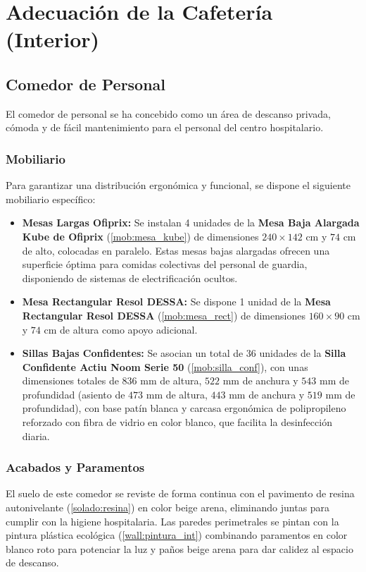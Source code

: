 \section{Adecuación de la Cafetería (Interior)}

\subsection{Comedor de Personal}
El comedor de personal se ha concebido como un área de descanso privada, cómoda y de fácil mantenimiento para el personal del centro hospitalario. 

\subsubsection{Mobiliario}
Para garantizar una distribución ergonómica y funcional, se dispone el siguiente mobiliario específico:
\begin{itemize}
    \item \textbf{Mesas Largas Ofiprix:} Se instalan 4 unidades de la \textbf{Mesa Baja Alargada Kube de Ofiprix} (\ref{mob:mesa_kube}) de dimensiones $240\times142\text{ cm}$ y $74\text{ cm}$ de alto, colocadas en paralelo. Estas mesas bajas alargadas ofrecen una superficie óptima para comidas colectivas del personal de guardia, disponiendo de sistemas de electrificación ocultos.
    \item \textbf{Mesa Rectangular Resol DESSA:} Se dispone 1 unidad de la \textbf{Mesa Rectangular Resol DESSA} (\ref{mob:mesa_rect}) de dimensiones $160\times90\text{ cm}$ y $74\text{ cm}$ de altura como apoyo adicional.
    \item \textbf{Sillas Bajas Confidentes:} Se asocian un total de 36 unidades de la \textbf{Silla Confidente Actiu Noom Serie 50} (\ref{mob:silla_conf}), con unas dimensiones totales de $836\text{ mm}$ de altura, $522\text{ mm}$ de anchura y $543\text{ mm}$ de profundidad (asiento de $473\text{ mm}$ de altura, $443\text{ mm}$ de anchura y $519\text{ mm}$ de profundidad), con base patín blanca y carcasa ergonómica de polipropileno reforzado con fibra de vidrio en color blanco, que facilita la desinfección diaria.
\end{itemize}

\subsubsection{Acabados y Paramentos}
El suelo de este comedor se reviste de forma continua con el pavimento de resina autonivelante (\ref{solado:resina}) en color beige arena, eliminando juntas para cumplir con la higiene hospitalaria. Las paredes perimetrales se pintan con la pintura plástica ecológica (\ref{wall:pintura_int}) combinando paramentos en color blanco roto para potenciar la luz y paños beige arena para dar calidez al espacio de descanso.

